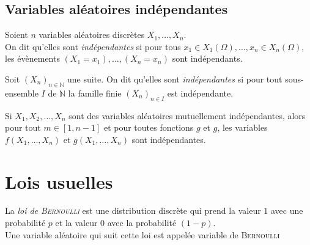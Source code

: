 \documentclass[11pt,a4paper,fleqn,pdftex]{report}
\begin{document}
\subsection{Variables aléatoires indépendantes} %
 \label{sub:variables_aleatoires_independantes}
 \begin{dfn}
      Soient $n$ variables aléatoires discrètes $X_1,\ldots, X_n$.\\ 
      On dit qu'elles sont \emph{indépendantes} si pour tous $x_1\in X_1(\Omega),\ldots,x_n\in X_n(\Omega)$, les évènements $(X_1 = x_1),\ldots ,(X_n = x_n)$ sont indépendants. 
 \end{dfn}
 \begin{dfn}
      Soit $(X_n)_{n\in \mathbb{N}}$ une suite. On dit qu'elles sont \emph{indépendantes} si pour tout sous-ensemble $I$ de $\mathbb{N}$ la famille finie $(X_n)_{n\in I}$ est indépendante. 
 \end{dfn}
 \begin{theorem}
      Si $X_1,X_2,\ldots ,X_n$ sont des variables aléatoires mutuellement indépendantes, alors pour tout $m \in [1, n-1 ]$ et pour toutes fonctions $g$ et $g$, les variables $f(X_1,\ldots ,X_n)$ et $g(X_1,\ldots ,X_n)$ sont indépendantes.
 \end{theorem}
\section{Lois usuelles} %
\label{sec:lois_usuelles}
\begin{dfn}
     La \emph{loi de \textsc{Bernoulli}} est une distribution discrète qui prend la valeur $1$ avec une probabilité $p$ et la valeur $0$ avec la probabilité $(1-p)$. \\
     Une variable aléatoire qui suit cette loi est appelée variable de \textsc{Bernoulli}
\end{dfn}
\end{document}
